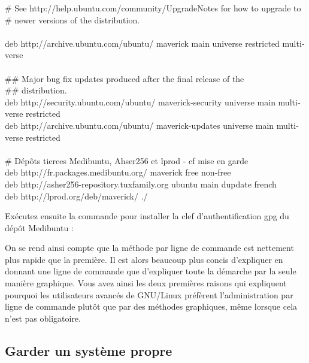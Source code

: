 	\begin{breakbox}%
		\begin{otherlanguage}{english}%
\# See http://help.ubuntu.com/community/UpgradeNotes for how to upgrade to\\
\# newer versions of the distribution.\\
\\
deb http://archive.ubuntu.com/ubuntu/ maverick main universe restricted multiverse\\
\\
\#\# Major bug fix updates produced after the final release of the\\
\#\# distribution.\\
deb http://security.ubuntu.com/ubuntu/ maverick-security universe main multiverse restricted\\
deb http://archive.ubuntu.com/ubuntu/ maverick-updates universe main multiverse restricted\\
\\
\# Dépôts tierces Medibuntu, Ahser256 et lprod - cf mise en garde\\
deb http://fr.packages.medibuntu.org/ maverick free non-free\\
deb http://asher256-repository.tuxfamily.org ubuntu main dupdate french\\
deb http://lprod.org/deb/maverick/ ./
		\end{otherlanguage}%
	\end{breakbox}%
\par
Exécutez ensuite la commande pour installer la clef d'authentification gpg du dépôt Medibuntu :\\\par
\begin{nota}
On se rend ainsi compte que la méthode par ligne de commande est nettement plus rapide que la première. Il est alors beaucoup plus concis d'expliquer en donnant une ligne de commande que d'expliquer toute la démarche par la seule manière graphique. Vous avez ainsi les deux premières raisons qui expliquent pourquoi les utilisateurs avancés de GNU/Linux préfèrent l'administration par ligne de commande plutôt que par des méthodes graphiques, même lorsque cela n'est pas obligatoire.
\end{nota}
\subsection{Garder un système propre}
\label{RefNettoyerSysteme}
